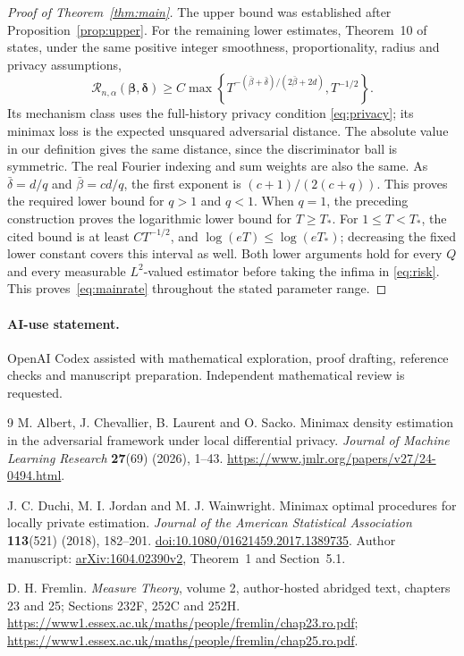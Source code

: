\documentclass[11pt]{article}
\begin{document}
\begin{proof}[Proof of Theorem~\ref{thm:main}]
The upper bound was established after Proposition~\ref{prop:upper}.
For the remaining lower estimates, Theorem~10 of~\cite[p.~14]{ACLS} states,
under the same positive integer smoothness, proportionality, radius and
privacy assumptions,
\[
 \mathcal R_{n,\alpha}(\boldsymbol\beta,\boldsymbol\delta)
 \ge C\max\left\{
 T^{-(\bar\beta+\bar\delta)/(2\bar\beta+2d)},T^{-1/2}\right\}.
\]
Its mechanism class uses the full-history privacy condition
\eqref{eq:privacy}; its minimax loss is the expected unsquared adversarial
distance. The absolute value in our definition gives the same distance,
since the discriminator ball is symmetric. The real Fourier indexing and
sum weights are also the same.
As $\bar\delta=d/q$ and $\bar\beta=cd/q$, the first exponent is
$(c+1)/(2(c+q))$. This proves the required lower bound for $q>1$ and $q<1$.
When $q=1$, the preceding construction proves the logarithmic lower bound
for $T\ge T_*$. For $1\le T<T_*$, the cited bound is at least
$C T^{-1/2}$, and $\log(eT)\le\log(eT_*)$; decreasing the fixed lower
constant covers this interval as well. Both lower arguments hold for every
$Q$ and every measurable $L^2$-valued estimator before taking the infima in
\eqref{eq:risk}. This proves~\eqref{eq:mainrate} throughout the stated
parameter range.
\end{proof}

\paragraph{AI-use statement.}
OpenAI Codex assisted with mathematical exploration, proof drafting,
reference checks and manuscript preparation. Independent mathematical review
is requested.

\begin{thebibliography}{9}
M. Albert, J. Chevallier, B. Laurent and O. Sacko.
\newblock Minimax density estimation in the adversarial framework under local
differential privacy.
\newblock \emph{Journal of Machine Learning Research} \textbf{27}(69)
(2026), 1--43.
\newblock \url{https://www.jmlr.org/papers/v27/24-0494.html}.

J. C. Duchi, M. I. Jordan and M. J. Wainwright.
\newblock Minimax optimal procedures for locally private estimation.
\newblock \emph{Journal of the American Statistical Association}
\textbf{113}(521) (2018), 182--201.
\newblock \href{https://doi.org/10.1080/01621459.2017.1389735}{doi:10.1080/01621459.2017.1389735}.
\newblock Author manuscript: \href{https://arxiv.org/abs/1604.02390v2}{arXiv:1604.02390v2},
Theorem~1 and Section~5.1.

D. H. Fremlin.
\newblock \emph{Measure Theory}, volume 2, author-hosted abridged text,
chapters 23 and 25; Sections 232F, 252C and 252H.
\newblock \url{https://www1.essex.ac.uk/maths/people/fremlin/chap23.ro.pdf};
\url{https://www1.essex.ac.uk/maths/people/fremlin/chap25.ro.pdf}.
\end{thebibliography}
\end{document}
